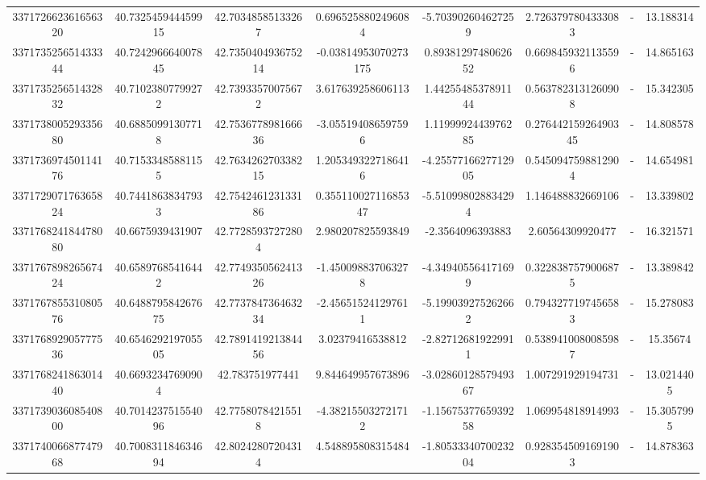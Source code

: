 \documentclass{article}
\begin{document}
\begin{landscape}
\begin{longtable}[c]{S[table-format=18.0]S[table-format=2.15]S[table-format=2.15]S[table-format=-2.17]S[table-format=-2.16]S[table-format=-2.16]S[table-format=-3.16]S[table-format=2.7]}
337172662361656320 & 40.732545944459915 & 42.70348585133267  & 0.6965258802496084    & -5.703902604627259   & 2.7263797804333083   & {-}                  & 13.188314  \\
337173525651433344 & 40.724296664007845 & 42.735040493675214 & -0.03814953070273175  & 0.8938129748062652   & 0.6698459321135596   & {-}                  & 14.865163  \\
337173525651432832 & 40.71023807799272  & 42.73933570075672  & 3.617639258606113     & 1.4425548537891144   & 0.5637823131260908   & {-}                  & 15.342305  \\
337173800529335680 & 40.68850991307718  & 42.753677898166636 & -3.055194086597596    & 1.1199992443976285   & 0.27644215926490345  & {-}                  & 14.808578  \\
337173697450114176 & 40.71533485881155  & 42.763426270338215 & 1.2053493227186416    & -4.2557716627712905  & 0.5450947598812904   & {-}                  & 14.654981  \\
337172907176365824 & 40.74418638347933  & 42.754246123133186 & 0.35511002711685347   & -5.510998028834294   & 1.146488832669106    & {-}                  & 13.339802  \\
337176824184478080 & 40.6675939431907   & 42.77285937272804  & 2.980207825593849     & -2.3564096393883     & 2.60564309920477     & {-}                  & 16.321571  \\
337176789826567424 & 40.65897685416442  & 42.774935056241326 & -1.450098837063278    & -4.349405564171699   & 0.3228387579006875   & {-}                  & 13.389842  \\
337176785531080576 & 40.648879584267675 & 42.773784736463234 & -2.456515241297611    & -5.199039275262662   & 0.7943277197456583   & {-}                  & 15.278083  \\
337176892905777536 & 40.654629219705505 & 42.789141921384456 & 3.02379416538812      & -2.827126819229911   & 0.5389410080085987   & {-}                  & 15.35674   \\
337176824186301440 & 40.66932347690904  & 42.783751977441    & 9.844649957673896     & -3.0286012857949367  & 1.007291929194731    & {-}                  & 13.0214405 \\
337173903608540800 & 40.701423751554096 & 42.77580784215518  & -4.382155032721712    & -1.1567537765939258  & 1.069954818914993    & {-}                  & 15.3057995 \\
337174006687747968 & 40.700831184634694 & 42.80242807204314  & 4.548895808315484     & -1.8053334070023204  & 0.9283545091691903   & {-}                  & 14.878363  \\

\end{longtable}
\end{landscape}
\end{document}
